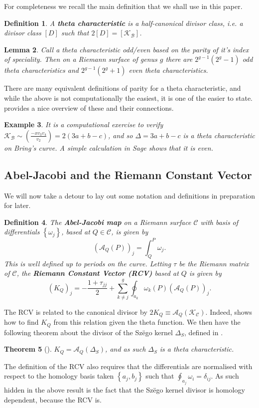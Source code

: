\documentclass{amsart}
\newtheorem{theorem}{Theorem}[section]
\newtheorem{lemma}[theorem]{Lemma}
\newtheorem{definition}[theorem]{Definition}
\newtheorem{example}[theorem]{Example}
\newcommand{\bam}[1]{\textbf{#1}}
\newcommand{\pround}[1]{\left( #1 \right)}
\newcommand{\pbrace}[1]{\left\{ #1 \right\} }
\begin{document}
For completeness we recall the main definition that we shall use in this paper.
\begin{definition}
A \bam{theta characteristic} is a half-canonical divisor class, i.e. a divisor class $[D]$ such that $2[D] = [\mathcal{K}_{\mathcal{B}}]$. 
\end{definition}
\begin{lemma}
Call a theta characteristic odd/even based on the parity of it's index of speciality. Then on a Riemann surface of genus $g$ there are $2^{g-1}(2^g-1)$ odd theta characteristics and $2^{g-1}(2^g+1)$ even theta characteristics. 
\end{lemma}
There are many equivalent definitions of parity for a theta characteristic, and while the above is not computationally the easiest, it is one of the easier to state. \cite{Farkas2012} provides a nice overview of these and their connections. 
\begin{example}\label{example: theta characteristic on Bring's curve}
It is a computational exercise to verify $\mathcal{K}_\mathcal{B} \sim \pround{\frac{-x v_3 v_4}{v_2}} = 2(3a+b-c)$, and so $\Delta = 3a+b-c$ is a theta characteristic on Bring's curve. A simple calculation in Sage shows that it is even. 
\end{example}

\subsection{Abel-Jacobi and the Riemann Constant Vector}\label{subsec: AJ and RCV}
We will now take a detour to lay out some notation and definitions in preparation for later.
\begin{definition}\label{def: AJ map and RCV}
The \bam{Abel-Jacobi map} on a Riemann surface $\mathcal{C}$ with basis of differentials $\pbrace{\omega_j}$, based at $Q \in \mathcal{C}$, is given by 
\[
(\mathcal{A}_Q(P))_j = \int_Q^P \omega_j  .
\]
This is well defined up to periods on the curve. Letting $\tau$ be the Riemann matrix of $\mathcal{C}$, the \bam{Riemann Constant Vector (RCV)} based at $Q$ is given by 
\[
(K_Q)_j = -\frac{1+\tau_{jj}}{2} + \sum_{k \neq j}^g \oint_{a_k} \omega_k(P) (\mathcal{A}_Q(P))_j  .
\]
\end{definition}
The RCV is related to the canonical divisor by $2K_Q\equiv\mathcal{A}_Q(\mathcal{K}_\mathcal{C})$. Indeed, \cite{Deconinck2015} shows how to find $K_Q$ from this relation given the theta function. We then have the following theorem about the divisor of the Sz\"ego kernel $\Delta_S$, defined in \cite{Fay1973}. 
\begin{theorem}[\cite{Fay1973}]
$K_Q = \mathcal{A}_Q(\Delta_S)$, and as such $\Delta_S$ is a theta characteristic.
\end{theorem}
The definition of the RCV also requires that the differentials are normalised with respect to the homology basis taken $\pbrace{a_j , b_j}$ such that $\oint_{a_j} \omega_i = \delta_{ij}$. As such hidden in the above result is the fact that the Sz\"ego kernel divisor is homology dependent, because the RCV is.
\end{document}
